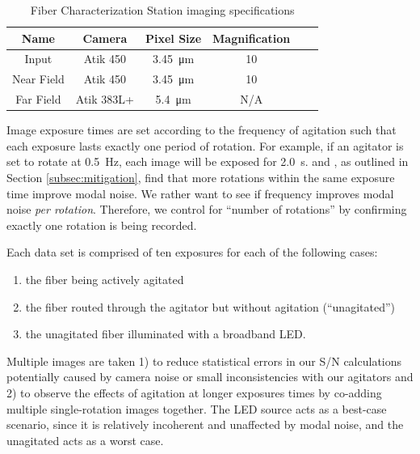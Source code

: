 \documentclass[twocolumn]{emulateapj}
\begin{document}
\begin{table}
\centering
\caption{Fiber Characterization Station imaging specifications}
	\begin{tabular}{cccccc}
	\hline
	Name & Camera & Pixel Size & Magnification \\
	\hline \hline
	Input & Atik 450 & \SI{3.45}{\micro\meter} & 10 \\
	\hline
	Near Field & Atik 450 & \SI{3.45}{\micro\meter} & 10 \\
	\hline
	Far Field & Atik 383L+ & \SI{5.4}{\micro\meter} & N/A \\
	\hline	
	\end{tabular}
\label{table:cameras}
\end{table}

Image exposure times are set according to the frequency of agitation such that each exposure lasts exactly one period of rotation. For example, if an agitator is set to rotate at \SI{0.5}{\hertz}, each image will be exposed for \SI{2.0}{\second}. \citet{Baudrand2001} and \citet{Lemke2011}, as outlined in Section \ref{subsec:mitigation}, find that more rotations within the same exposure time improve modal noise. We rather want to see if frequency improves modal noise \textit{per rotation}. Therefore, we control for ``number of rotations'' by confirming exactly one rotation is being recorded.

Each data set is comprised of ten exposures for each of the following cases:
\begin{enumerate}
\item the fiber being actively agitated
\item the fiber routed through the agitator but without agitation (``unagitated'')
\item the unagitated fiber illuminated with a broadband LED.
\end{enumerate}
Multiple images are taken 1) to reduce statistical errors in our S/N calculations potentially caused by camera noise or small inconsistencies with our agitators and 2) to observe the effects of agitation at longer exposures times by co-adding multiple single-rotation images together. The LED source acts as a best-case scenario, since it is relatively incoherent and unaffected by modal noise, and the unagitated acts as a worst case.
\end{document}
